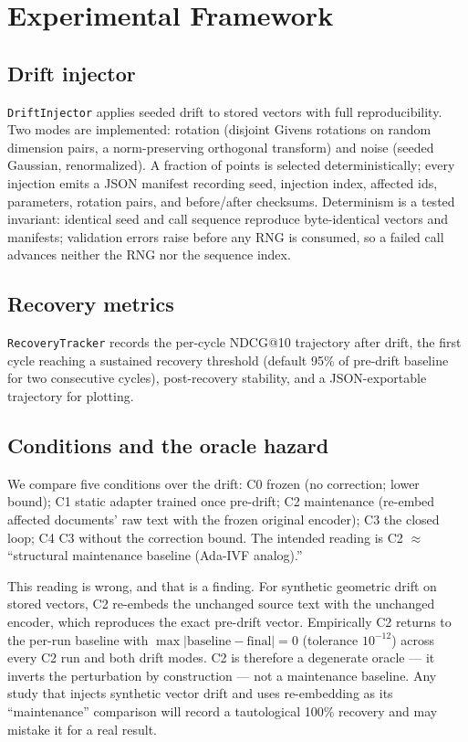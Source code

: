 \documentclass[12pt]{article}
\begin{document}
\section{Experimental Framework}
\label{sec:framework}

\subsection{Drift injector}
\label{sec:drift-injector}

\texttt{DriftInjector} applies seeded drift to stored vectors with full reproducibility. Two modes are implemented: rotation (disjoint Givens rotations on random dimension pairs, a norm-preserving orthogonal transform) and noise (seeded Gaussian, renormalized). A fraction of points is selected deterministically; every injection emits a JSON manifest recording seed, injection index, affected ids, parameters, rotation pairs, and before/after checksums. Determinism is a tested invariant: identical seed and call sequence reproduce byte-identical vectors and manifests; validation errors raise before any RNG is consumed, so a failed call advances neither the RNG nor the sequence index.

\subsection{Recovery metrics}
\label{sec:recovery-metrics}

\texttt{RecoveryTracker} records the per-cycle NDCG@10 trajectory after drift, the first cycle reaching a sustained recovery threshold (default 95\% of pre-drift baseline for two consecutive cycles), post-recovery stability, and a JSON-exportable trajectory for plotting.

\subsection{Conditions and the oracle hazard}
\label{sec:conditions}

We compare five conditions over the drift: C0 frozen (no correction; lower bound); C1 static adapter trained once pre-drift; C2 maintenance (re-embed affected documents' raw text with the frozen original encoder); C3 the closed loop; C4 C3 without the correction bound. The intended reading is C2 $\approx$ ``structural maintenance baseline (Ada-IVF analog).''

This reading is wrong, and that is a finding. For synthetic geometric drift on stored vectors, C2 re-embeds the unchanged source text with the unchanged encoder, which reproduces the exact pre-drift vector. Empirically C2 returns to the per-run baseline with $\max|\mathrm{baseline} - \mathrm{final}| = 0$ (tolerance $10^{-12}$) across every C2 run and both drift modes. C2 is therefore a degenerate oracle --- it inverts the perturbation by construction --- not a maintenance baseline. Any study that injects synthetic vector drift and uses re-embedding as its ``maintenance'' comparison will record a tautological 100\% recovery and may mistake it for a real result.
\end{document}
